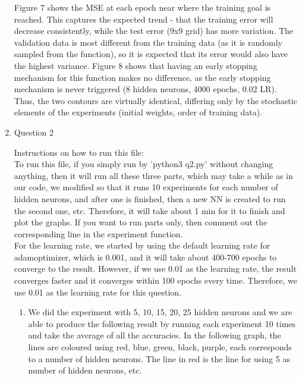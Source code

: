 \documentclass[11pt]{article}
\begin{document}
\begin{enumerate}
Figure 7 shows the MSE at each epoch near where the training goal is reached. This captures the expected trend - that the training error will decrease consistently, while the test error (9x9 grid) has more variation. The validation data is most different from the training data (as it is randomly sampled from the function), so it is expected that its error would also have the highest variance.\newline
Figure 8 shows that having an early stopping mechanism for this function makes no difference, as the early stopping mechanism is never triggered (8 hidden neurons, 4000 epochs, 0.02 LR). Thus, the two contours are virtually identical, differing only by the stochastic elements of the experiments (initial weights, order of training data). 


\item Question 2\newline

Instructions on how to run this file:\\
To run this file, if you simply run by 'python3 q2.py' without changing anything, then  it will run all these three parts, which may take a while as in our code, we modified so that it runs 10 experiments for each number of hidden neurons, and after one is finished, then a new NN is created to run the second one, etc. Therefore, it will take about 1 min for it to finish and plot the graphs. If you want to run parts only, then comment out the corresponding line in the experiment function.\\
For the learning rate, we started by using the default learning rate for adamoptimizer, which is 0.001, and it will take about 400-700 epochs to converge to the result. However, if we use 0.01 as the learning rate, the result converges faster and it converges within 100 epochs every time. Therefore, we use 0.01 as the learning rate for this question.\\

% 
\begin{enumerate}
\item We did the experiment with 5, 10, 15, 20, 25 hidden neurons and we are able to produce the following result by running each experiment 10 times and take the average of all the accuracies. In the following graph, the lines are coloured using red, blue, green, black, purple, each corresponds to a number of hidden neurons. The line in red is the line for using 5 as number of hidden neurons, etc.\newline


\end{enumerate}
\end{enumerate}
\end{document}
